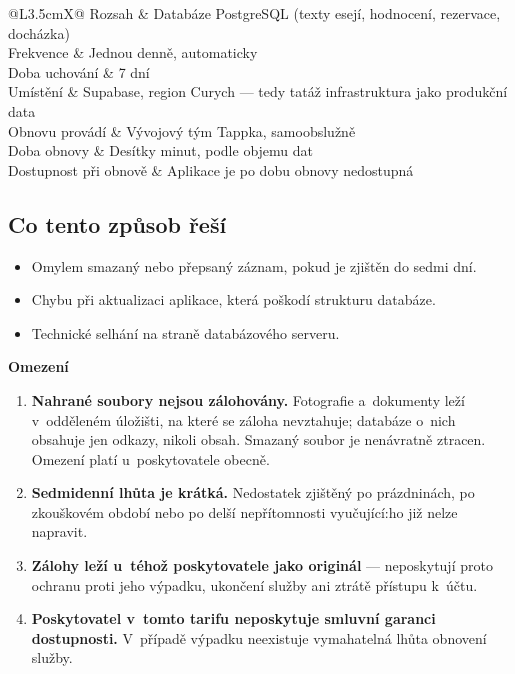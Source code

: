 \documentclass[11pt,a4paper]{article}
\makeatletter
\newcommand{\headfont}{\fontfamily{Montserrat-TLF}\selectfont}
\newcommand{\boxhead}[2]{{\headfont\bfseries\color{#1}#2}\par\smallskip}
\newcommand{\parametry}[1]{%
  \begin{tabularx}{\textwidth}{@{}L{3.5cm}X@{}}\toprule #1 \bottomrule\end{tabularx}}
\makeatother
\begin{document}
\parametry{%
Rozsah & Databáze PostgreSQL (texty esejí, hodnocení, rezervace, docházka) \\
Frekvence & Jednou denně, automaticky \\
Doba uchování & 7 dní \\
Umístění & Supabase, region Curych --- tedy tatáž infrastruktura jako produkční data \\
Obnovu provádí & Vývojový tým Tappka, samoobslužně \\
Doba obnovy & Desítky minut, podle objemu dat \\
Dostupnost při obnově & Aplikace je po dobu obnovy nedostupná \\
}

\subsection{Co tento způsob řeší}

\begin{itemize}
  \item Omylem smazaný nebo přepsaný záznam, pokud je zjištěn do sedmi dní.
  \item Chybu při aktualizaci aplikace, která poškodí strukturu databáze.
  \item Technické selhání na straně databázového serveru.
\end{itemize}

\begin{pozor}
\boxhead{tapwarn}{Omezení}
\begin{enumerate}[leftmargin=1.3em, itemsep=4pt]
  \item \textbf{Nahrané soubory nejsou zálohovány.} Fotografie a~dokumenty leží v~odděleném
        úložišti, na které se záloha nevztahuje; databáze o~nich obsahuje jen odkazy, nikoli
        obsah. Smazaný soubor je nenávratně ztracen. Omezení platí u~poskytovatele obecně.
  \item \textbf{Sedmidenní lhůta je krátká.} Nedostatek zjištěný po prázdninách, po zkouškovém
        období nebo po delší nepřítomnosti vyučující:ho již nelze napravit.
  \item \textbf{Zálohy leží u~téhož poskytovatele jako originál} --- neposkytují proto ochranu
        proti jeho výpadku, ukončení služby ani ztrátě přístupu k~účtu.
  \item \textbf{Poskytovatel v~tomto tarifu neposkytuje smluvní garanci dostupnosti.} V~případě
        výpadku neexistuje vymahatelná lhůta obnovení služby.
\end{enumerate}
\end{pozor}
\end{document}
